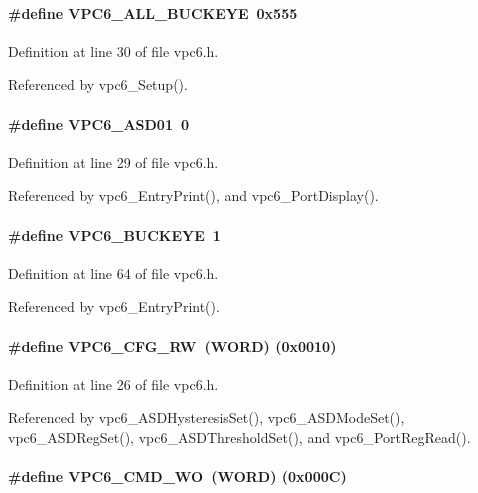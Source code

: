 \paragraph[{VPC6\_\-ALL\_\-BUCKEYE}]{\setlength{\rightskip}{0pt plus 5cm}\#define VPC6\_\-ALL\_\-BUCKEYE~0x555}\hfill\label{vpc6_8h_acd07598e6feba55ea35da9eaa04c6a60}


Definition at line 30 of file vpc6.h.

Referenced by vpc6\_\-Setup().
\paragraph[{VPC6\_\-ASD01}]{\setlength{\rightskip}{0pt plus 5cm}\#define VPC6\_\-ASD01~0}\hfill\label{vpc6_8h_a4878c8af1b7fef1633a839d3fc961299}


Definition at line 29 of file vpc6.h.

Referenced by vpc6\_\-EntryPrint(), and vpc6\_\-PortDisplay().
\paragraph[{VPC6\_\-BUCKEYE}]{\setlength{\rightskip}{0pt plus 5cm}\#define VPC6\_\-BUCKEYE~1}\hfill\label{vpc6_8h_a96b958c9cf18d9c8698ad0793aea4cc9}


Definition at line 64 of file vpc6.h.

Referenced by vpc6\_\-EntryPrint().
\paragraph[{VPC6\_\-CFG\_\-RW}]{\setlength{\rightskip}{0pt plus 5cm}\#define VPC6\_\-CFG\_\-RW~({\bf WORD}) (0x0010)}\hfill\label{vpc6_8h_a26d11389a14e96cdc3083bb33ca0fb64}


Definition at line 26 of file vpc6.h.

Referenced by vpc6\_\-ASDHysteresisSet(), vpc6\_\-ASDModeSet(), vpc6\_\-ASDRegSet(), vpc6\_\-ASDThresholdSet(), and vpc6\_\-PortRegRead().
\paragraph[{VPC6\_\-CMD\_\-WO}]{\setlength{\rightskip}{0pt plus 5cm}\#define VPC6\_\-CMD\_\-WO~({\bf WORD}) (0x000C)}\hfill\label{vpc6_8h_adf30008bccf13c4a8e1f91431f37ef23}


